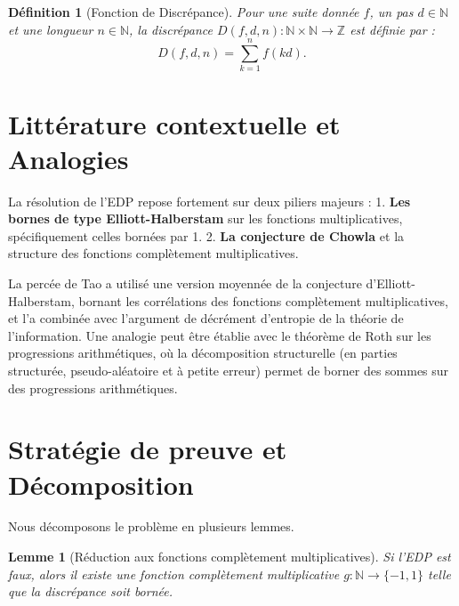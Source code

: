 \documentclass[12pt]{article}
\newtheorem{lemma}[theorem]{Lemme}
\newtheorem{definition}[theorem]{D\'efinition}
\begin{document}
\begin{definition}[Fonction de Discr\'epance]
Pour une suite donn\'ee $f$, un pas $d \in \mathbb{N}$ et une longueur $n \in \mathbb{N}$, la discr\'epance $D(f, d, n) : \mathbb{N} \times \mathbb{N} \to \mathbb{Z}$ est d\'efinie par :
\[
D(f, d, n) = \sum_{k=1}^n f(kd).
\]
\end{definition}

\section{Litt\'erature contextuelle et Analogies}

La r\'esolution de l'EDP repose fortement sur deux piliers majeurs :
1. \textbf{Les bornes de type Elliott-Halberstam} sur les fonctions multiplicatives, sp\'ecifiquement celles born\'ees par 1.
2. \textbf{La conjecture de Chowla} et la structure des fonctions compl\`etement multiplicatives.

La perc\'ee de Tao a utilis\'e une version moyenn\'ee de la conjecture d'Elliott-Halberstam, bornant les corr\'elations des fonctions compl\`etement multiplicatives, et l'a combin\'ee avec l'argument de d\'ecr\'ement d'entropie de la th\'eorie de l'information. Une analogie peut \^etre \'etablie avec le th\'eor\`eme de Roth sur les progressions arithm\'etiques, o\`u la d\'ecomposition structurelle (en parties structur\'ee, pseudo-al\'eatoire et \`a petite erreur) permet de borner des sommes sur des progressions arithm\'etiques.

\section{Strat\'egie de preuve et D\'ecomposition}

Nous d\'ecomposons le probl\`eme en plusieurs lemmes.

\begin{lemma}[R\'eduction aux fonctions compl\`etement multiplicatives]
Si l'EDP est faux, alors il existe une fonction compl\`etement multiplicative $g : \mathbb{N} \to \{-1, 1\}$ telle que la discr\'epance soit born\'ee.
\end{lemma}
\end{document}

